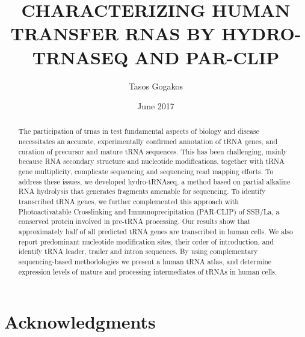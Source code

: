 \documentclass[12pt]{rockefeller}
\begin{document}
\author{Tasos Gogakos}
\title{\MakeUppercase{Characterizing human transfer rnas by hydro-trnaseq and par-clip}}
\date{June 2017}

\maketitle

\thispagestyle{empty}
\makecopyright


\begin{abstract}

The participation of \glspl{trna} in \gls{test} fundamental aspects of biology and disease necessitates an accurate, experimentally confirmed annotation of tRNA genes, and curation of precursor and mature tRNA sequences. This has been challenging, mainly because RNA secondary structure and nucleotide modifications, together with tRNA gene multiplicity, complicate sequencing and sequencing read mapping efforts. To address these issues, we developed hydro-tRNAseq, a method based on partial alkaline RNA hydrolysis that generates fragments amenable for sequencing. To identify transcribed tRNA genes, we further complemented this approach with Photoactivatable Crosslinking and Immunoprecipitation (PAR-CLIP) of SSB/La, a conserved protein involved in pre-tRNA processing. Our results show that approximately half of all predicted tRNA genes are transcribed in human cells. We also report predominant nucleotide modification sites, their order of introduction, and identify tRNA leader, trailer and intron sequences. By using complementary sequencing-based methodologies we present a human tRNA atlas, and determine expression levels of mature and processing intermediates of tRNAs in human cells.
\end{abstract}


\chapter*{} %
\addtocounter{page}{2} %
\vspace{3in} %
\begin{flushright} %
\end{flushright}

\chapter*{Acknowledgments} %
\end{document}
